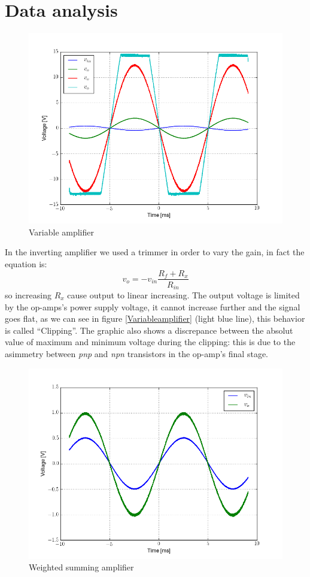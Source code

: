 \section{Data analysis}
\begin{figure}[H]
\centering
\includegraphics[width=.7\textwidth]{2/Variable_amplifier.png}
\caption{Variable amplifier}\label{Variableamplifier}
\end{figure}
In the inverting amplifier we used a trimmer in order to vary the gain, in fact the equation is:
\[v_{o} = -v_{in}\frac{R_f+R_x}{R_{in}}\]
so increasing $R_x$ cause output to linear increasing. The output voltage is limited by the op-amps's power supply voltage, it cannot increase further and the signal goes flat, as we can see in figure \eqref{Variableamplifier} (light blue line), this behavior is called ``Clipping''. The graphic also shows a discrepance between the absolut value of maximum and minimum voltage during the clipping: this is due to the asimmetry between \emph{pnp} and \emph{npn} transistors in the op-amp's final stage.
\begin{figure}[H]
\centering
\includegraphics[width=.7\textwidth]{2/Weighted_amplifier.png}
\caption{Weighted summing amplifier}\label{Weighted_amplifier}
\end{figure}
